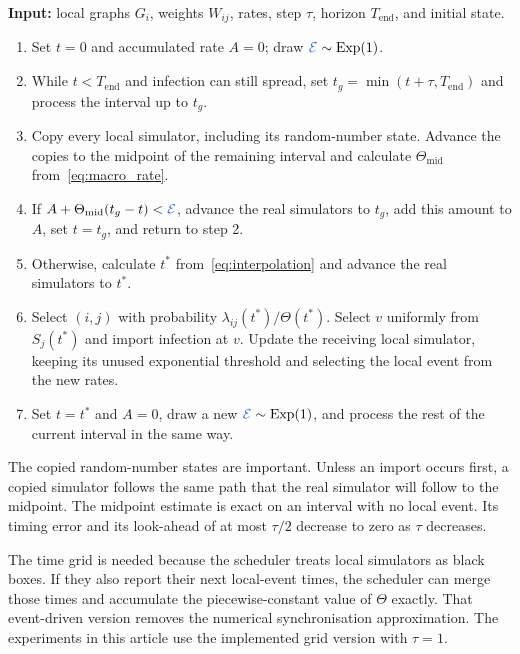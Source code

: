 \documentclass{ieeeaccess}
\newcommand{\michael}[2]{{\color{RoyalBlue}#1}}
\newcommand{\Exp}{\mathrm{Exp}}
\begin{document}
\begin{algorithm}[tbp]
\color{black}
\caption{\textcolor{black}{Grid-synchronised two-scale simulation of one realisation.}}
\label{alg:scheduler}
\small

\textbf{Input:} local graphs $G_i$, weights $W_{ij}$, rates, step $\tau$, horizon $T_{\mathrm{end}}$, and initial state.
\begin{enumerate}
\item Set $t=0$ and accumulated rate $A=0$; draw $\michael{\mathcal E}{E}\sim\Exp(1)$.
\item While $t<T_{\mathrm{end}}$ and infection can still spread, set $t_g=\min(t+\tau,T_{\mathrm{end}})$ and process the interval up to $t_g$.
\item Copy every local simulator, including its random-number state. Advance the copies to the midpoint of the remaining interval and calculate $\Theta_{\mathrm{mid}}$ from~\eqref{eq:macro_rate}.
\item If $A+\Theta_{\mathrm{mid}}(t_g-t)<\michael{\mathcal E}{E}$, advance the real simulators to $t_g$, add this amount to $A$, set $t=t_g$, and return to step 2.
\item Otherwise, calculate $t^\ast$ from~\eqref{eq:interpolation} and advance the real simulators to $t^\ast$.
\item Select $(i,j)$ with probability $\lambda_{ij}(t^\ast)/\Theta(t^\ast)$. Select $v$ uniformly from $S_j(t^\ast)$ and import infection at $v$. Update the receiving local simulator, keeping its unused exponential threshold and selecting the local event from the new rates.
\item Set $t=t^\ast$ and $A=0$, draw a new $\michael{\mathcal E}{E}\sim\Exp(1)$, and process the rest of the current interval in the same way.
\end{enumerate}

\end{algorithm}

The copied random-number states are important. Unless an import occurs first, a copied simulator follows the same path that the real simulator will follow to the midpoint. The midpoint estimate is exact on an interval with no local event. Its timing error and its look-ahead of at most $\tau/2$ decrease to zero as $\tau$ decreases.

The time grid is needed because the scheduler treats local simulators as black boxes. If they also report their next local-event times, the scheduler can merge those times and accumulate the piecewise-constant value of $\Theta$ exactly. That event-driven version removes the numerical synchronisation approximation. The experiments in this article use the implemented grid version with $\tau=1$.
\end{document}
